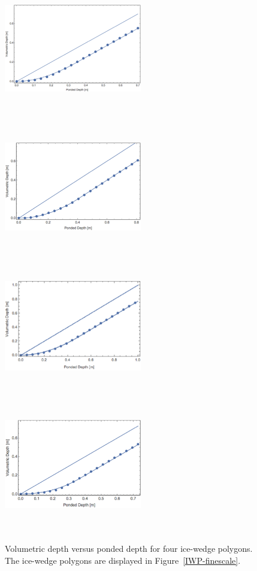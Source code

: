 \documentclass[review,11pt]{elsarticle}
\begin{document}
\begin{figure}
\centering
\includegraphics[width=6cm, height=6cm]{./figures/polygons-finescale/picture2.png}
\includegraphics[width=6cm, height=6cm]{./figures/polygons-finescale/picture3.png}\\
\includegraphics[width=6cm, height=6cm]{./figures/polygons-finescale/polygon40.png}
\includegraphics[width=6cm, height=6cm]{./figures/polygons-finescale/picture4.png}
\caption{Volumetric depth versus ponded depth for four ice-wedge polygons. The ice-wedge polygons are displayed in Figure~\ref{IWP-finescale}.}
\label{volumetric-depth-fig1}
\end{figure}
\end{document}

